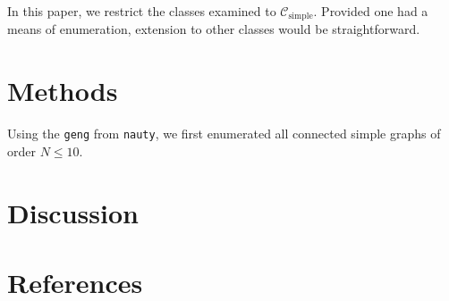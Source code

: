 \documentclass[12pt]{article}
\begin{document}
In this paper, we restrict the classes examined to $\mathcal{C}_\text{simple}$.
Provided one had a means of enumeration, extension to other classes would be straightforward.

\section{Methods}
Using the \texttt{geng} from \texttt{nauty}, we first enumerated all connected simple graphs of order $N \le 10$.

\section{Discussion}
\section{References}
\end{document}
